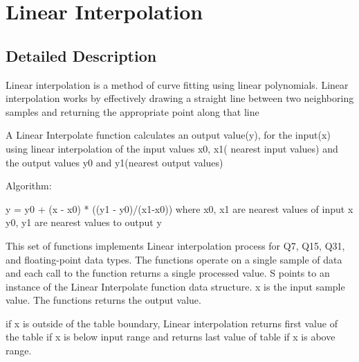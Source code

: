 \hypertarget{group___linear_interpolate}{}\section{Linear Interpolation}
\label{group___linear_interpolate}


\subsection{Detailed Description}
Linear interpolation is a method of curve fitting using linear polynomials. Linear interpolation works by effectively drawing a straight line between two neighboring samples and returning the appropriate point along that line

\begin{DoxyParagraph}{}
 
\end{DoxyParagraph}
\begin{DoxyParagraph}{}
A Linear Interpolate function calculates an output value(y), for the input(x) using linear interpolation of the input values x0, x1( nearest input values) and the output values y0 and y1(nearest output values)
\end{DoxyParagraph}
\begin{DoxyParagraph}{Algorithm\+:}

\begin{DoxyPre}
      y = y0 + (x - x0) * ((y1 - y0)/(x1-x0))
      where x0, x1 are nearest values of input x
            y0, y1 are nearest values to output y
\end{DoxyPre}

\end{DoxyParagraph}
\begin{DoxyParagraph}{}
This set of functions implements Linear interpolation process for Q7, Q15, Q31, and floating-\/point data types. The functions operate on a single sample of data and each call to the function returns a single processed value. {\ttfamily S} points to an instance of the Linear Interpolate function data structure. {\ttfamily x} is the input sample value. The functions returns the output value.
\end{DoxyParagraph}
\begin{DoxyParagraph}{}
if x is outside of the table boundary, Linear interpolation returns first value of the table if x is below input range and returns last value of table if x is above range. 
\end{DoxyParagraph}
